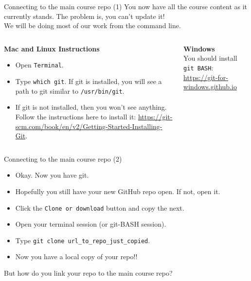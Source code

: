 \documentclass[onlymath, nologo]{beamer}
\begin{document}
  \begin{frame}{Connecting to the main course repo (1)}
    You now have all the course content as it currently stands.  The problem is, you can't update it! \\[1.0em]

    We will be doing most of our work from the command line. \\[-1.0em]

    \begin{columns}[T]
      \begin{column}{0.5\textwidth}
        \begin{center}
          \textbf{Mac and Linux Instructions}
        \end{center}
        \vspace{-1.0em}
        \begin{itemize}
          \item Open \texttt{Terminal}.
          \item Type \texttt{which git}.  If git is installed, you will see a path to git similar to \texttt{/usr/bin/git}.
          \item If git is not installed, then you won't see anything.  Follow the instructions here to install it: 
                \url{https://git-scm.com/book/en/v2/Getting-Started-Installing-Git}.
        \end{itemize}
      \end{column}
      \begin{column}{0.5\textwidth}
        \begin{center}
          \textbf{Windows} \\[1.0em]
          You should install \texttt{git BASH}:  \url{https://git-for-windows.github.io}
        \end{center}
      \end{column}
    \end{columns}
  \end{frame}

  \begin{frame}{Connecting to the main course repo (2)}
    \begin{itemize}
      \item Okay.  Now you have git.
      \item Hopefully you still have your new GitHub repo open.  If not, open it.
      \item Click the \texttt{Clone or download} button and copy the next. 
      \item Open your terminal session (or git-BASH session). 
      \item Type \texttt{git clone url\_to\_repo\_just\_copied}. 
      \item Now you have a local copy of your repo!!
    \end{itemize}
    But how do you link your repo to the main course repo?
  \end{frame}
\end{document}
